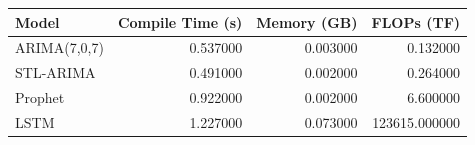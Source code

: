 \begin{tabular}{lrrr}
\toprule
Model & Compile Time (s) & Memory (GB) & FLOPs (TF) \\
\midrule
ARIMA(7,0,7) & 0.537000 & 0.003000 & 0.132000 \\
STL-ARIMA & 0.491000 & 0.002000 & 0.264000 \\
Prophet & 0.922000 & 0.002000 & 6.600000 \\
LSTM & 1.227000 & 0.073000 & 123615.000000 \\
\bottomrule
\end{tabular}
